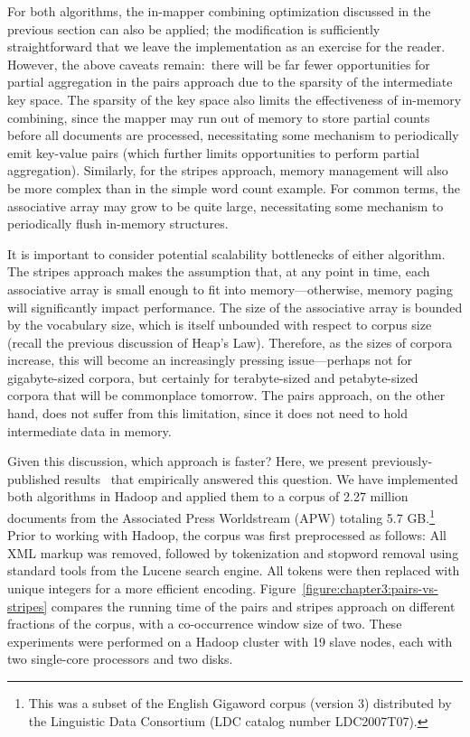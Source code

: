 For both algorithms, the in-mapper combining optimization discussed in
the previous section can also be applied; the modification is
sufficiently straightforward that we leave the implementation as an
exercise for the reader.  However, the above caveats remain:\ there
will be far fewer opportunities for partial aggregation in the pairs
approach due to the sparsity of the intermediate key space.  The
sparsity of the key space also limits the effectiveness of in-memory
combining, since the mapper may run out of memory to store partial
counts before all documents are processed, necessitating some
mechanism to periodically emit key-value pairs (which further limits
opportunities to perform partial aggregation).  Similarly, for the
stripes approach, memory management will also be more complex than in
the simple word count example.  For common terms, the associative
array may grow to be quite large, necessitating some mechanism to
periodically flush in-memory structures.

It is important to consider potential scalability bottlenecks of
either algorithm.  The stripes approach makes the assumption that, at
any point in time, each associative array is small enough to fit into
memory---otherwise, memory paging will significantly impact
performance.  The size of the associative array is bounded by the
vocabulary size, which is itself unbounded with respect to corpus size
(recall the previous discussion of Heap's Law).  Therefore, as the
sizes of corpora increase, this will become an increasingly pressing
issue---perhaps not for gigabyte-sized corpora, but certainly for
terabyte-sized and petabyte-sized corpora that will be commonplace
tomorrow.  The pairs approach, on the other hand, does not suffer from
this limitation, since it does not need to hold intermediate data in
memory.

Given this discussion, which approach is faster?  Here, we present
previously-published results~\cite{Lin_EMNLP2008} that empirically
answered this question.  We have implemented both algorithms in Hadoop
and applied them to a corpus of 2.27 million documents from the
Associated Press Worldstream (APW) totaling 5.7 GB.\footnote{This was
  a subset of the English Gigaword corpus (version 3) distributed by
  the Linguistic Data Consortium (LDC catalog number LDC2007T07).}
Prior to working with Hadoop, the corpus was first preprocessed as
follows: All XML markup was removed, followed by tokenization and
stopword removal using standard tools from the Lucene search engine.
All tokens were then replaced with unique integers for a more
efficient encoding.  Figure~\ref{figure:chapter3:pairs-vs-stripes}
compares the running time of the pairs and stripes approach on
different fractions of the corpus, with a co-occurrence window size of
two.  These experiments were performed on a Hadoop cluster with 19
slave nodes, each with two single-core processors and two disks.

